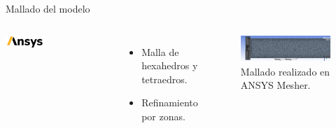 \begin{frame}{Mallado del modelo}
    \begin{columns}
        \centering
        \includegraphics[height=0.13\textwidth]{dump/ansys.png}
        \\[0.5cm]
            \begin{itemize}
                \item Malla de hexahedros y tetraedros.
                \item Refinamiento por zonas.
            \end{itemize}
        \begin{block}{}
            \begin{figure}[ht!]
                \centering
                \includegraphics[width=\textwidth]{dump/mesh.png}
                \caption{Mallado realizado en ANSYS Mesher.}
            \end{figure}
        \end{block}  
    \end{columns}
\end{frame}

